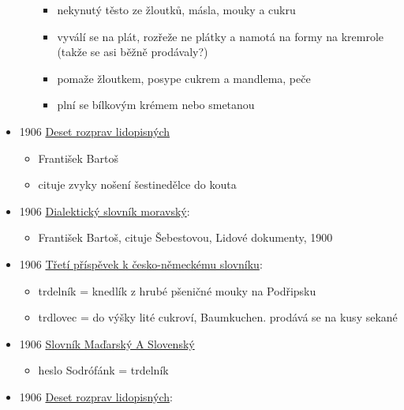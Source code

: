 \begin{itemize}
\begin{itemize}
    \begin{itemize}
    \tightlist
    \item
      nekynutý těsto ze žloutků, másla, mouky a cukru
    \item
      vyválí se na plát, rozřeže ne plátky a namotá na formy na kremrole
      (takže se asi běžně prodávaly?)
    \item
      pomaže žloutkem, posype cukrem a mandlema, peče
    \item
      plní se bílkovým krémem nebo smetanou
    \end{itemize}
  \end{itemize}
\item
  1906
  \href{https://ceskadigitalniknihovna.cz/uuid/uuid:50b3ac32-1b3f-4639-9f61-c01f3883690d}{Deset
  rozprav lidopisných}

  \begin{itemize}
  \tightlist
  \item
    František Bartoš
  \item
    cituje zvyky nošení šestinedělce do kouta
  \end{itemize}
\item
  1906
  \href{https://ceskadigitalniknihovna.cz/view/uuid:d04052b0-a08e-11ed-bf61-5ef3fc9bb22f?page=uuid:50e42324-813b-4538-aaf5-2b1efbf63513&fulltext=trd*ln*k*&source=nkp}{Dialektický
  slovník moravský}:

  \begin{itemize}
  \tightlist
  \item
    František Bartoš, cituje Šebestovou, Lidové dokumenty, 1900
  \end{itemize}
\item
  1906
  \href{https://ndk.cz/uuid/uuid:6a5d3470-e943-11e2-9923-005056827e52}{Třetí
  příspěvek k česko-německému slovníku}:

  \begin{itemize}
  \tightlist
  \item
    trdelník = knedlík z hrubé pšeničné mouky na Podřipsku
  \item
    trdlovec = do výšky lité cukroví, Baumkuchen. prodává se na kusy
    sekané
  \end{itemize}
\item
  1906
  \href{https://dikda.snk.sk/uuid/uuid:a5d481cd-45e0-4830-8eb3-f6a70599c799}{Slovník
  Maďarský A Slovenský}

  \begin{itemize}
  \tightlist
  \item
    heslo Sodrófánk = trdelník
  \end{itemize}
\item
  1906
  \href{https://ceskadigitalniknihovna.cz/view/uuid:50b3ac32-1b3f-4639-9f61-c01f3883690d?page=uuid:ad4dfae7-7a29-11ed-b508-001b63bd97ba&fulltext=trdeln\%C3\%ADky&source=kfbz}{Deset
  rozprav lidopisných}:


\end{itemize}
